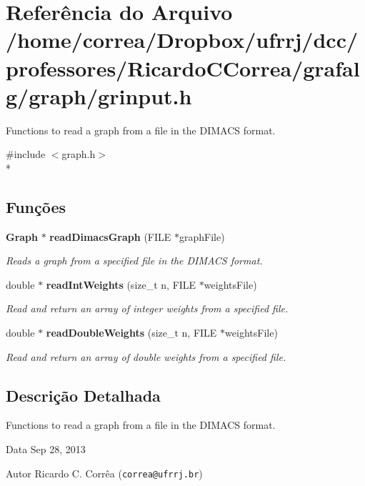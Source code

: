 \section{Referência do Arquivo /home/correa/\+Dropbox/ufrrj/dcc/professores/\+Ricardo\+C\+Correa/grafalg/graph/grinput.h}
\label{grinput_8h}


Functions to read a graph from a file in the D\+I\+M\+A\+CS format.  


{\ttfamily \#include $<$graph.\+h$>$}\\*
\subsection*{Funções}
\begin{DoxyCompactItemize}
\item 
{\bf Graph} $\ast$ {\bf read\+Dimacs\+Graph} (F\+I\+LE $\ast$graph\+File)
\begin{DoxyCompactList}\small\item\em Reads a graph from a specified file in the D\+I\+M\+A\+CS format. \end{DoxyCompactList}\item 
double $\ast$ {\bf read\+Int\+Weights} (size\+\_\+t n, F\+I\+LE $\ast$weights\+File)
\begin{DoxyCompactList}\small\item\em Read and return an array of integer weights from a specified file. \end{DoxyCompactList}\item 
double $\ast$ {\bf read\+Double\+Weights} (size\+\_\+t n, F\+I\+LE $\ast$weights\+File)
\begin{DoxyCompactList}\small\item\em Read and return an array of double weights from a specified file. \end{DoxyCompactList}\end{DoxyCompactItemize}


\subsection{Descrição Detalhada}
Functions to read a graph from a file in the D\+I\+M\+A\+CS format. 

\begin{DoxyDate}{Data}
Sep 28, 2013 
\end{DoxyDate}
\begin{DoxyAuthor}{Autor}
Ricardo C. Corrêa ({\tt correa@ufrrj.\+br}) 
\end{DoxyAuthor}


